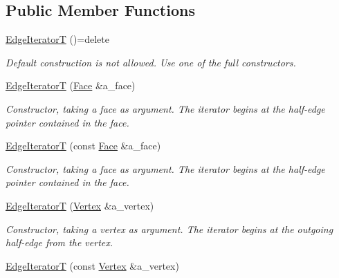 \subsection*{Public Member Functions}
\begin{DoxyCompactItemize}
\item 
\mbox{\label{classDcel_1_1EdgeIteratorT_a20ff352f5f61ce6297e82d5be43377ce}} 
\hyperlink{classDcel_1_1EdgeIteratorT_a20ff352f5f61ce6297e82d5be43377ce}{Edge\+IteratorT} ()=delete
\begin{DoxyCompactList}\small\item\em Default construction is not allowed. Use one of the full constructors. \end{DoxyCompactList}\item 
\hyperlink{classDcel_1_1EdgeIteratorT_aefe8b41b1b21825922096a45ce645149}{Edge\+IteratorT} (\hyperlink{classDcel_1_1EdgeIteratorT_a59cc24c2a7a6a12c5c60bc04b0ac7497}{Face} \&a\+\_\+face)
\begin{DoxyCompactList}\small\item\em Constructor, taking a face as argument. The iterator begins at the half-\/edge pointer contained in the face. \end{DoxyCompactList}\item 
\hyperlink{classDcel_1_1EdgeIteratorT_a1e47d3f1320c6ce4f37e1772ed936451}{Edge\+IteratorT} (const \hyperlink{classDcel_1_1EdgeIteratorT_a59cc24c2a7a6a12c5c60bc04b0ac7497}{Face} \&a\+\_\+face)
\begin{DoxyCompactList}\small\item\em Constructor, taking a face as argument. The iterator begins at the half-\/edge pointer contained in the face. \end{DoxyCompactList}\item 
\hyperlink{classDcel_1_1EdgeIteratorT_a0041cf8e8c4dcdda12a514aa64e295f7}{Edge\+IteratorT} (\hyperlink{classDcel_1_1EdgeIteratorT_a4ca07f27da7faf50db5dbd1f20bbcafb}{Vertex} \&a\+\_\+vertex)
\begin{DoxyCompactList}\small\item\em Constructor, taking a vertex as argument. The iterator begins at the outgoing half-\/edge from the vertex. \end{DoxyCompactList}\item 
\hyperlink{classDcel_1_1EdgeIteratorT_abda0210d73dd861142c8e23b4d589bd0}{Edge\+IteratorT} (const \hyperlink{classDcel_1_1EdgeIteratorT_a4ca07f27da7faf50db5dbd1f20bbcafb}{Vertex} \&a\+\_\+vertex)

\end{DoxyCompactItemize}
